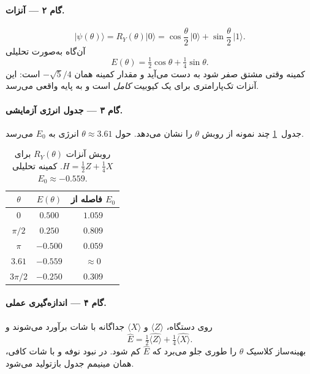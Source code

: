 \paragraph{گام ۲ --- آنزات.}
\begin{equation}
	\lvert\psi(\theta)\rangle
	=
	R_Y(\theta)\lvert0\rangle
	=
	\cos\frac\theta2\,\lvert0\rangle
	+
	\sin\frac\theta2\,\lvert1\rangle.
\end{equation}
آن‌گاه به‌صورت تحلیلی
\begin{equation}
	E(\theta)
	=
	\tfrac12\cos\theta + \tfrac14\sin\theta.
\end{equation}
کمینه وقتی مشتق صفر شود به دست می‌آید و مقدار کمینه همان $- \sqrt{5}/4$ است: این آنزات تک‌پارامتری برای یک کیوبیت \emph{کامل} است و به پایه واقعی می‌رسد.

\paragraph{گام ۳ --- جدول انرژی آزمایشی.}
جدول~\ref{tab:vqe-scan} چند نمونه از روبش $\theta$ را نشان می‌دهد. حول $\theta\approx 3.61$ انرژی به $E_0$ می‌رسد.

\begin{table}[htbp]
	\centering
	\footnotesize
	\caption{روبش آنزات $R_Y(\theta)$ برای $H=\tfrac12 Z+\tfrac14 X$. کمینه تحلیلی $E_0\approx-0.559$.}
	\label{tab:vqe-scan}
	\begin{tabular}{@{}ccc@{}}
		\toprule
		\rowcolor{gray!14}
		$\theta$ & $E(\theta)$ & فاصله از $E_0$ \\
		\midrule
		$0$ & $0.500$ & $1.059$ \\
		\rowcolor{gray!8}
		$\pi/2$ & $0.250$ & $0.809$ \\
		$\pi$ & $-0.500$ & $0.059$ \\
		\rowcolor{gray!8}
		$3.61$ & $-0.559$ & $\approx 0$ \\
		$3\pi/2$ & $-0.250$ & $0.309$ \\
		\bottomrule
	\end{tabular}
\end{table}

\paragraph{گام ۴ --- اندازه‌گیری عملی.}
روی دستگاه، $\langle Z\rangle$ و $\langle X\rangle$ جداگانه با شات برآورد می‌شوند و
\begin{equation}
	\widehat{E}=\tfrac12\widehat{\langle Z\rangle}+\tfrac14\widehat{\langle X\rangle}.
\end{equation}
بهینه‌ساز کلاسیک $\theta$ را طوری جلو می‌برد که $\widehat{E}$ کم شود. در نبود نوفه و با شات کافی، همان مینیمم جدول بازتولید می‌شود.

